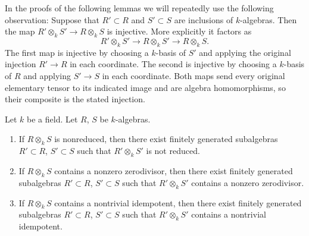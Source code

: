 \noindent
In the proofs of the following lemmas we will repeatedly use
the following observation: Suppose that $R' \subset R$ and
$S' \subset S$ are inclusions of $k$-algebras.
Then the map $R' \otimes_k S' \to R \otimes_k S$
is injective. More explicitly it factors as
$$
R'\otimes_kS'\longrightarrow R\otimes_kS'
\longrightarrow R\otimes_kS.
$$
The first map is injective by choosing a
$k$-basis of $S'$ and applying the original
injection $R'\to R$ in each coordinate.
The second is injective by choosing a
$k$-basis of $R$ and applying $S'\to S$
in each coordinate. Both maps send every
original elementary tensor to its indicated
image and are algebra homomorphisms, so
their composite is the stated injection.

\begin{lemma}
\label{editorial-source-lemma-limit-argument}
Let $k$ be a field. Let $R$, $S$ be $k$-algebras.
\begin{enumerate}
\item If $R \otimes_k S$ is nonreduced, then there exist
finitely generated subalgebras $R' \subset R$,
$S' \subset S$ such that $R' \otimes_k S'$ is not reduced.
\item If $R \otimes_k S$ contains a nonzero zerodivisor, then there exist
finitely generated subalgebras $R' \subset R$,
$S' \subset S$ such that $R' \otimes_k S'$ contains a nonzero zerodivisor.
\item If $R \otimes_k S$ contains a nontrivial idempotent, then there exist
finitely generated subalgebras $R' \subset R$,
$S' \subset S$ such that $R' \otimes_k S'$ contains a nontrivial idempotent.
\end{enumerate}
\end{lemma}

